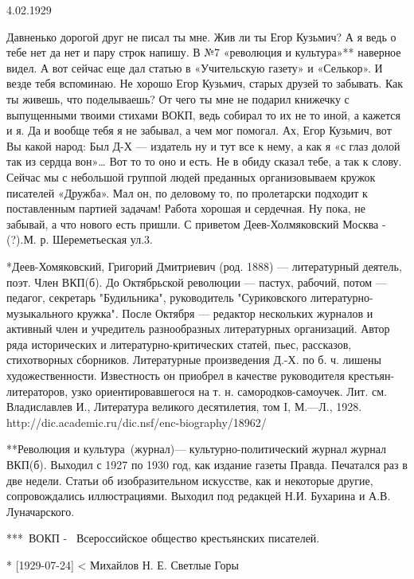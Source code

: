 \documentclass[]{memoir}
\begin{document}
4.02.1929

Давненько дорогой друг не писал ты мне.
Жив ли ты Егор Кузьмич? А я ведь о тебе нет да нет и пару строк напишу. В №7 «революция и культура»** наверное видел. А вот сейчас еще дал статью в «Учительскую газету» и «Селькор». И везде тебя вспоминаю. Не хорошо Егор Кузьмич, старых друзей то забывать. Как ты живешь, что поделываешь? От чего ты мне не подарил книжечку с выпущенными твоими стихами ВОКП, ведь собирал то их не то иной, а кажется и я. Да и вообще тебя я не забывал, а чем мог помогал. Ах, Егор Кузьмич, вот Вы какой народ: Был Д-Х — издатель ну и тут все к нему, а как я «с глаз долой так из сердца вон»… Вот то то оно и есть. Не в обиду сказал тебе, а так к слову. Сейчас мы с небольшой группой людей преданных организовываем кружок писателей «Дружба». Мал он, по деловому то, по пролетарски подходит к поставленным партией задачам!
Работа хорошая и сердечная. Ну пока, не забывай, а что нового есть пришли.
С приветом Деев-Холмяковский
Москва - (?).М. р. Шереметьеская ул.3.




*Деев-Хомяковский, Григорий Дмитриевич 
(род. 1888) — литературный деятель, поэт. Член ВКП(б). До Октябрьской революции — пастух, рабочий, потом — педагог, секретарь "Будильника", руководитель "Суриковского литературно-музыкального кружка". После Октября — редактор нескольких журналов и активный член и учредитель разнообразных литературных организаций. Автор ряда исторических и литературно-критических статей, пьес, рассказов, стихотворных сборников. Литературные произведения Д.-Х. по б. ч. лишены художественности. Известность он приобрел в качестве руководителя крестьян-литераторов, узко ориентировавшегося на т. н. самородков-самоучек.
Лит. см. Владиславлев И., Литература великого десятилетия, том I, М.—Л., 1928. 
http://dic.academic.ru/dic.nsf/enc-biography/18962/%


**Революция и культура (журнал)— культурно-политический журнал журнал ВКП(б). Выходил с 1927 по 1930 год, как издание газеты Правда. Печатался раз в две недели. Статьи об изобразительном искусстве, как и некоторые другие, сопровождались иллюстрациями. Выходил под редакцей Н.И. Бухарина и А.В. Луначарского.

*** ВОКП -  Всероссийское общество крестьянских писателей. 



* [1929-07-24] < Михайлов Н. Е.
Светлые Горы
\end{document}
